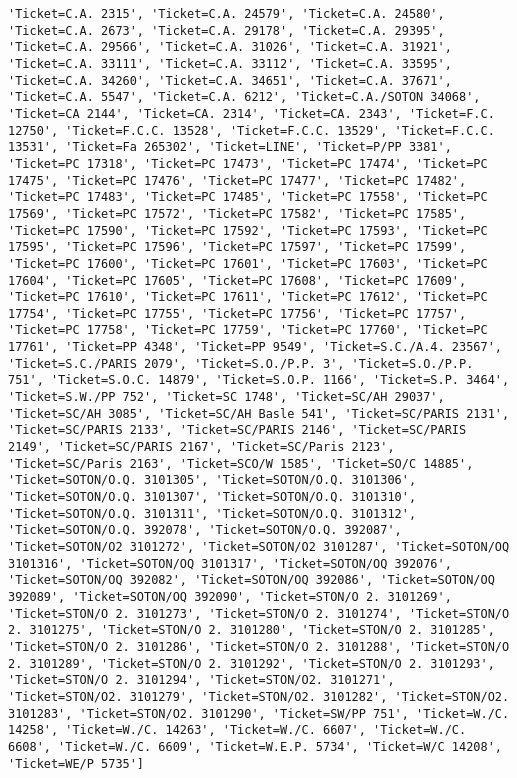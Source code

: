 \documentclass[11pt]{article}
\begin{document}
\begin{Verbatim}[commandchars=\\\{\}]
'Ticket=C.A. 2315', 'Ticket=C.A. 24579', 'Ticket=C.A. 24580', 'Ticket=C.A. 2673', 'Ticket=C.A. 29178', 'Ticket=C.A. 29395', 'Ticket=C.A. 29566', 'Ticket=C.A. 31026', 'Ticket=C.A. 31921', 'Ticket=C.A. 33111', 'Ticket=C.A. 33112', 'Ticket=C.A. 33595', 'Ticket=C.A. 34260', 'Ticket=C.A. 34651', 'Ticket=C.A. 37671', 'Ticket=C.A. 5547', 'Ticket=C.A. 6212', 'Ticket=C.A./SOTON 34068', 'Ticket=CA 2144', 'Ticket=CA. 2314', 'Ticket=CA. 2343', 'Ticket=F.C. 12750', 'Ticket=F.C.C. 13528', 'Ticket=F.C.C. 13529', 'Ticket=F.C.C. 13531', 'Ticket=Fa 265302', 'Ticket=LINE', 'Ticket=P/PP 3381', 'Ticket=PC 17318', 'Ticket=PC 17473', 'Ticket=PC 17474', 'Ticket=PC 17475', 'Ticket=PC 17476', 'Ticket=PC 17477', 'Ticket=PC 17482', 'Ticket=PC 17483', 'Ticket=PC 17485', 'Ticket=PC 17558', 'Ticket=PC 17569', 'Ticket=PC 17572', 'Ticket=PC 17582', 'Ticket=PC 17585', 'Ticket=PC 17590', 'Ticket=PC 17592', 'Ticket=PC 17593', 'Ticket=PC 17595', 'Ticket=PC 17596', 'Ticket=PC 17597', 'Ticket=PC 17599', 'Ticket=PC 17600', 'Ticket=PC 17601', 'Ticket=PC 17603', 'Ticket=PC 17604', 'Ticket=PC 17605', 'Ticket=PC 17608', 'Ticket=PC 17609', 'Ticket=PC 17610', 'Ticket=PC 17611', 'Ticket=PC 17612', 'Ticket=PC 17754', 'Ticket=PC 17755', 'Ticket=PC 17756', 'Ticket=PC 17757', 'Ticket=PC 17758', 'Ticket=PC 17759', 'Ticket=PC 17760', 'Ticket=PC 17761', 'Ticket=PP 4348', 'Ticket=PP 9549', 'Ticket=S.C./A.4. 23567', 'Ticket=S.C./PARIS 2079', 'Ticket=S.O./P.P. 3', 'Ticket=S.O./P.P. 751', 'Ticket=S.O.C. 14879', 'Ticket=S.O.P. 1166', 'Ticket=S.P. 3464', 'Ticket=S.W./PP 752', 'Ticket=SC 1748', 'Ticket=SC/AH 29037', 'Ticket=SC/AH 3085', 'Ticket=SC/AH Basle 541', 'Ticket=SC/PARIS 2131', 'Ticket=SC/PARIS 2133', 'Ticket=SC/PARIS 2146', 'Ticket=SC/PARIS 2149', 'Ticket=SC/PARIS 2167', 'Ticket=SC/Paris 2123', 'Ticket=SC/Paris 2163', 'Ticket=SCO/W 1585', 'Ticket=SO/C 14885', 'Ticket=SOTON/O.Q. 3101305', 'Ticket=SOTON/O.Q. 3101306', 'Ticket=SOTON/O.Q. 3101307', 'Ticket=SOTON/O.Q. 3101310', 'Ticket=SOTON/O.Q. 3101311', 'Ticket=SOTON/O.Q. 3101312', 'Ticket=SOTON/O.Q. 392078', 'Ticket=SOTON/O.Q. 392087', 'Ticket=SOTON/O2 3101272', 'Ticket=SOTON/O2 3101287', 'Ticket=SOTON/OQ 3101316', 'Ticket=SOTON/OQ 3101317', 'Ticket=SOTON/OQ 392076', 'Ticket=SOTON/OQ 392082', 'Ticket=SOTON/OQ 392086', 'Ticket=SOTON/OQ 392089', 'Ticket=SOTON/OQ 392090', 'Ticket=STON/O 2. 3101269', 'Ticket=STON/O 2. 3101273', 'Ticket=STON/O 2. 3101274', 'Ticket=STON/O 2. 3101275', 'Ticket=STON/O 2. 3101280', 'Ticket=STON/O 2. 3101285', 'Ticket=STON/O 2. 3101286', 'Ticket=STON/O 2. 3101288', 'Ticket=STON/O 2. 3101289', 'Ticket=STON/O 2. 3101292', 'Ticket=STON/O 2. 3101293', 'Ticket=STON/O 2. 3101294', 'Ticket=STON/O2. 3101271', 'Ticket=STON/O2. 3101279', 'Ticket=STON/O2. 3101282', 'Ticket=STON/O2. 3101283', 'Ticket=STON/O2. 3101290', 'Ticket=SW/PP 751', 'Ticket=W./C. 14258', 'Ticket=W./C. 14263', 'Ticket=W./C. 6607', 'Ticket=W./C. 6608', 'Ticket=W./C. 6609', 'Ticket=W.E.P. 5734', 'Ticket=W/C 14208', 'Ticket=WE/P 5735']

    \end{Verbatim}
\end{document}
